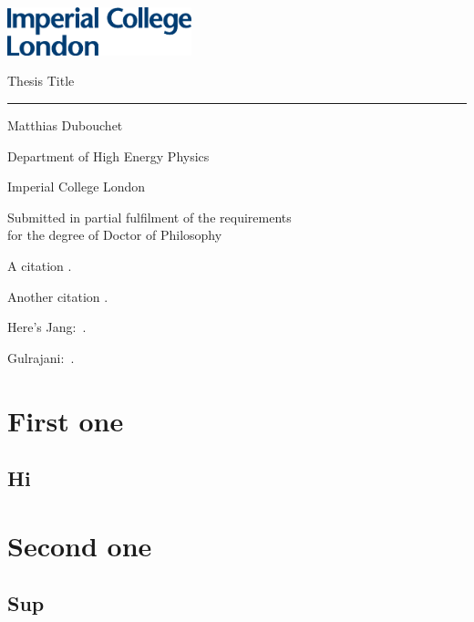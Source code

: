 \documentclass[12pt, a4paper, twoside]{report}
\begin{document}
\thispagestyle{empty}
\includegraphics[width=0.4\textwidth]{IMP_ML_1CS_4CP.eps}
\vfill
\begin{center}
    
    {\huge Thesis Title}
    
    \rule{7cm}{1pt}
    \vspace{2cm}
    
    {\Large Matthias Dubouchet}
    \vspace{1cm}
    
    {\Large Department of High Energy Physics
    
    Imperial College London}
    \vspace{3cm}
    
    {\large Submitted in partial fulfilment of the requirements\\for the degree of Doctor of Philosophy}
    
\end{center}

\vfill
\clearpage

\shipout\null






\tableofcontents
\printglossary[type=\acronymtype]
\clearpage












A citation \cite{butter_how_2019}.

Another citation \cite{butter_how_2019}.

Here's Jang:~\cite{45822}.

Gulrajani:~\cite{NIPS2017_892c3b1c}.

\appendix
\chapter{First one}
\section{Hi}
\chapter{Second one}
\section{Sup}

\printbibliography

\listoffigures
\listoftables
\end{document}
